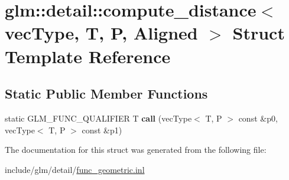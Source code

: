 \hypertarget{structglm_1_1detail_1_1compute__distance}{}\section{glm\+:\+:detail\+:\+:compute\+\_\+distance$<$ vec\+Type, T, P, Aligned $>$ Struct Template Reference}
\label{structglm_1_1detail_1_1compute__distance}
\subsection*{Static Public Member Functions}
\begin{DoxyCompactItemize}
\item 
\mbox{\label{structglm_1_1detail_1_1compute__distance_ae3530a70eb2be3a5e5760ca95aeb5cc4}} 
static G\+L\+M\+\_\+\+F\+U\+N\+C\+\_\+\+Q\+U\+A\+L\+I\+F\+I\+ER T {\bfseries call} (vec\+Type$<$ T, P $>$ const \&p0, vec\+Type$<$ T, P $>$ const \&p1)
\end{DoxyCompactItemize}


The documentation for this struct was generated from the following file\+:\begin{DoxyCompactItemize}
\item 
include/glm/detail/\hyperlink{func__geometric_8inl}{func\+\_\+geometric.\+inl}\end{DoxyCompactItemize}
